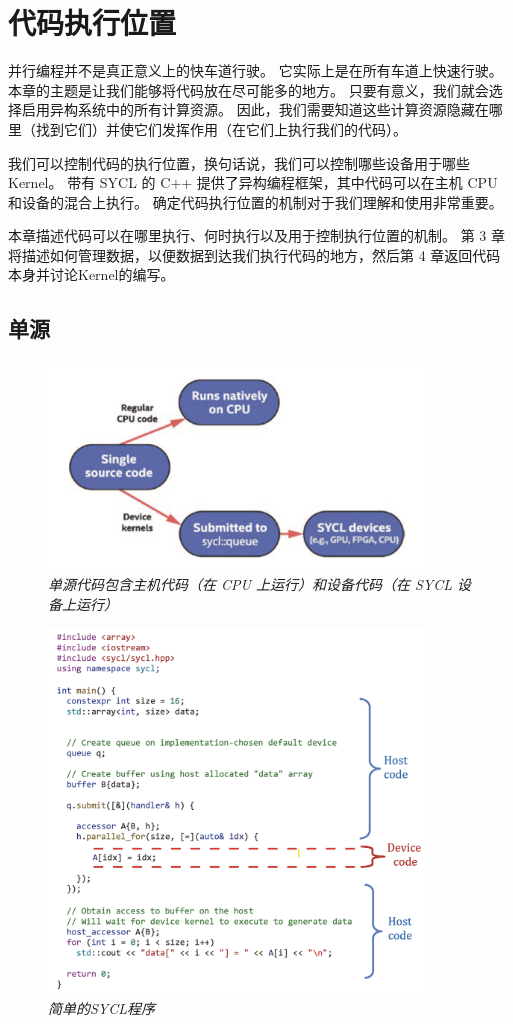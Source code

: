 \section{代码执行位置}
并行编程并不是真正意义上的快车道行驶。 它实际上是在所有车道上快速行驶。 本章的主题是让我们能够将代码放在尽可能多的地方。 
只要有意义，我们就会选择启用异构系统中的所有计算资源。 
因此，我们需要知道这些计算资源隐藏在哪里（找到它们）并使它们发挥作用（在它们上执行我们的代码）。

我们可以控制代码的执行位置，换句话说，我们可以控制哪些设备用于哪些Kernel。 
带有 SYCL 的 C++ 提供了异构编程框架，其中代码可以在主机 CPU 和设备的混合上执行。 
确定代码执行位置的机制对于我们理解和使用非常重要。

本章描述代码可以在哪里执行、何时执行以及用于控制执行位置的机制。 
第 3 章将描述如何管理数据，以便数据到达我们执行代码的地方，然后第 4 章返回代码本身并讨论Kernel的编写。


\subsection{单源}
\begin{figure}[H]
	\centering
	\includegraphics[width=0.9\textwidth]{figs/F2.1.png}
	\caption{\textit{单源代码包含主机代码（在 CPU 上运行）和设备代码（在 SYCL 设备上运行）}}
\end{figure}


\begin{figure}[H]
	\centering
	\includegraphics[width=0.9\textwidth]{figs/F2.2.png}
	\caption{\textit{简单的SYCL程序}}
\end{figure}

